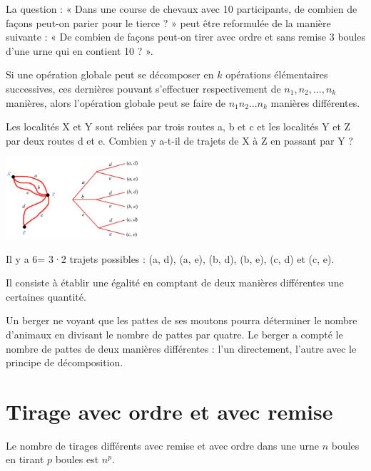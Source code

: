 \documentclass{book}
\begin{document}
\begin{Exemple} La question : « Dans une course de chevaux avec 10 participants, de combien de
façons peut-on parier pour le tierce ? » peut être reformulée de la manière
suivante : « De combien de façons peut-on tirer avec ordre et sans remise 3 boules d'une urne qui en
contient 10 ? ».
\end{Exemple}
\begin{Methode}[Décomposition]\normalfont Si une opération globale peut se décomposer en $k$ opérations élémentaires successives,
ces dernières pouvant s'effectuer respectivement de $n_1, n_2, ..., n_k$ manières, alors
l'opération globale peut se faire de $n_1 n_2 ... n_k$ manières différentes.
\end{Methode}
\begin{Exemple}Les localités X et Y sont reliées par trois routes a, b et c et les localités Y et Z par deux
routes d et e. Combien y a-t-il de trajets de X à Z en passant par Y ?\\
\begin{center}
\includegraphics[width=5cm]{chemin.png}
\end{center}
Il y a 6= 3·2 trajets possibles : (a, d), (a, e), (b, d), (b, e), (c, d) et (c, e).
\end{Exemple}
\begin{Methode} \normalfont Il consiste à établir une égalité en comptant de deux manières différentes une certaines quantité. 
\end{Methode}
\begin{Exemple}
Un berger ne voyant que les pattes de ses moutons pourra déterminer le nombre d'animaux en divisant le nombre de pattes par quatre. Le berger a compté le nombre de pattes de deux manières différentes : l'un directement, l'autre avec le principe de décomposition.  
\end{Exemple}
\section{Tirage avec ordre et avec remise}
\begin{Proposition} Le nombre de tirages différents avec remise et avec ordre dans une urne $n$ boules en tirant $p$ boules est  $n^p$.
\end{Proposition}
\end{document}
